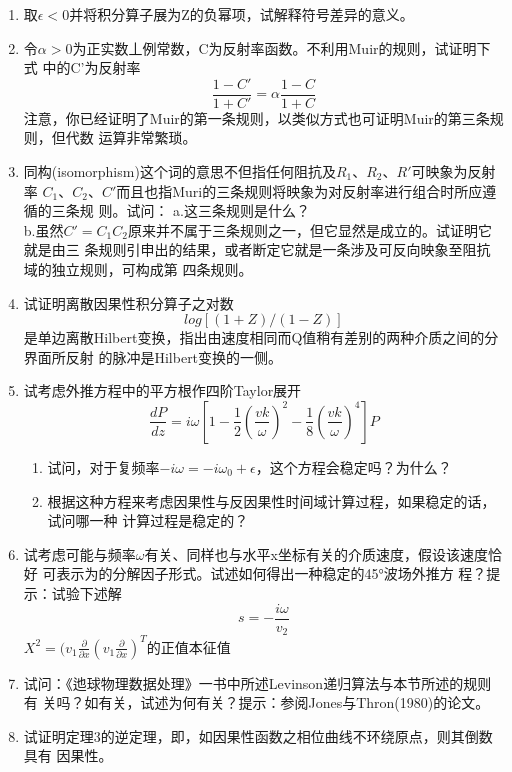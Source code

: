 \begin{enumerate}
\item 取$\epsilon <0$并将积分算子展为Z的负幂项，试解释符号差异的意义。
\item 令$\alpha >0$为正实数丄例常数，C为反射率函数。不利用Muir的规则，试证明下式
中的C'为反射率
\begin{equation*}
\frac{1-C'}{1+C'}=\alpha \frac{1-C}{1+C}
\end{equation*}
注意，你已经证明了Muir的第一条规则，以类似方式也可证明Muir的第三条规则，但代数
运算非常繁琐。

\item
  同构(isomorphism)这个词的意思不但指任何阻抗及$R_1$、$R_2$、$R'$可映象为反射率
  $C_1$、$C_2$、$C'$而且也指Muri的三条规则将映象为对反射率进行组合时所应遵循的三条规
  则。试问：
  a.这三条规则是什么？\\
  b.虽然$C'=C_1C_2$原来并不属于三条规则之一，但它显然是成立的。试证明它就是由三
条规则引申出的结果，或者断定它就是一条涉及可反向映象至阻抗域的独立规则，可构成第
四条规则。

\item 试证明离散因果性积分算子之对数
\begin{equation*}
log[(1+Z)/(1-Z)]
\end{equation*}
是单边离散Hilbert变换，指出由速度相同而Q值稍有差别的两种介质之间的分界面所反射
的脉冲是Hilbert变换的一侧。

\item 试考虑外推方程中的平方根作四阶Taylor展开
\begin{equation*}
\frac{dP}{dz}=i\omega[1-\frac{1}{2}(\frac{vk}{\omega})^2-\frac{1}{8}(\frac{vk}{\omega})^4]P
\end{equation*}
\begin{enumerate}
\item
  试问，对于复频率$-i\omega=-i\omega_0+\epsilon$，这个方程会稳定吗？为什么？
\item
  根据这种方程来考虑因果性与反因果性时间域计算过程，如果稳定的话，试问哪一种
  计算过程是稳定的？
\end{enumerate}
\item 试考虑可能与频率$\omega$有关、同样也与水平x坐标有关的介质速度，假设该速度恰好
可表示为的分解因子形式。试述如何得出一种稳定的45°波场外推方
程？提示：试验下述解
\begin{equation*}
s=-\frac{i\omega}{v_2}
\end{equation*}
$X^2=(v_1\frac{\partial}{\partial x}(v_1\frac{\partial}{\partial x})^T$的正值本征值

\item 试问：《迆球物理数据处理》一书中所述Levinson递归算法与本节所述的规则有
关吗？如有关，试述为何有关？提示：参阅Jones与Thron(1980)的论文。

\item 试证明定理3的逆定理，即，如因果性函数之相位曲线不环绕原点，则其倒数具有
因果性。


\end{enumerate}